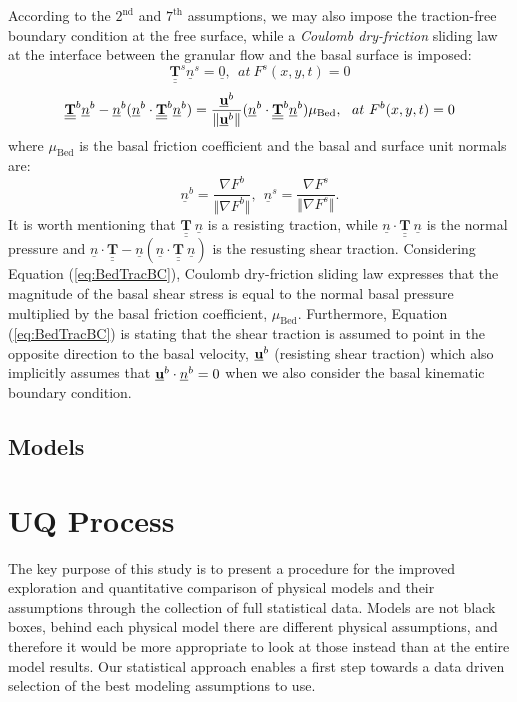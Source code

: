 \documentclass{article}
\begin{document}
According to the $\mathrm{2^{nd}}$ and $\mathrm{7^{th}}$ assumptions, we may also impose the traction-free boundary condition at the free surface, while a \textit{Coulomb dry-friction} sliding law at the interface between the granular flow and the basal surface is imposed:
\begin{equation}\label{eq:SurTracBC}
\underline{\underline{{\mathbf{T}}}}^s\underline{n}^s=\underline{0}, \ \ at \ F^s(x,y,t)=0
\end{equation}
\begin{equation}\label{eq:BedTracBC}
\underline{\underline{{\mathbf{T}}}}^b\underline{n}^b-\underline{n}^b(\underline{n}^b\cdot \underline{\underline{{\mathbf{T}}}}^b\underline{n}^b)=\frac{\underline{{\textbf u}}^b}{\Vert\underline{{\textbf u}}^b\Vert}(\underline{n}^b\cdot \underline{\underline{{\mathbf{T}}}}^b\underline{n}^b)\mu_{\mathrm{Bed}}, \ \ at \ F^b(x,y,t)=0
\end{equation}
where $\mu_{\mathrm{Bed}}$ is the basal friction coefficient and the basal and surface unit normals are:
\begin{equation}
\underline{n}^b=\frac{\nabla F^b}{\Vert\nabla F^b\Vert}, \ \ \underline{n}^s=\frac{\nabla F^s}{\Vert\nabla F^s\Vert}.
\end{equation}
It is worth mentioning that $\underline{\underline{{\mathbf{T}}}} \ \underline{n}$ is a resisting traction, while $\underline{n}\cdot\underline{\underline{{\mathbf{T}}}} \ \underline{n}$ is the normal pressure and $\underline{n}\cdot\underline{\underline{{\mathbf{T}}}}-\underline{n}(\underline{n}\cdot\underline{\underline{{\mathbf{T}}}} \ \underline{n})$ is the resusting shear traction. Considering Equation (\ref{eq:BedTracBC}), Coulomb dry-friction sliding law expresses that the magnitude of the basal shear stress is equal to the normal basal pressure multiplied by the basal friction coefficient, $\mu_{\mathrm{Bed}}$. Furthermore, Equation (\ref{eq:BedTracBC}) is stating that the shear traction is assumed to point in the opposite direction to the basal velocity, $\underline{{\textbf u}}^b$ (resisting shear traction) which also implicitly assumes that $\underline{{\textbf u}}^b\cdot \underline{n}^b=0$ when we also consider the basal kinematic boundary condition.

\subsection{Models}\label{subsec:Models}

\section{UQ Process}
The key purpose of this study is to present a procedure for the improved exploration and quantitative comparison of physical models and their assumptions through the collection of full statistical data. Models are not black boxes, behind each physical model there are different physical assumptions, and therefore it would be more appropriate to look at those instead than at the entire model results. Our statistical approach enables a first step towards a data driven selection of the best modeling assumptions to use.
\end{document}
